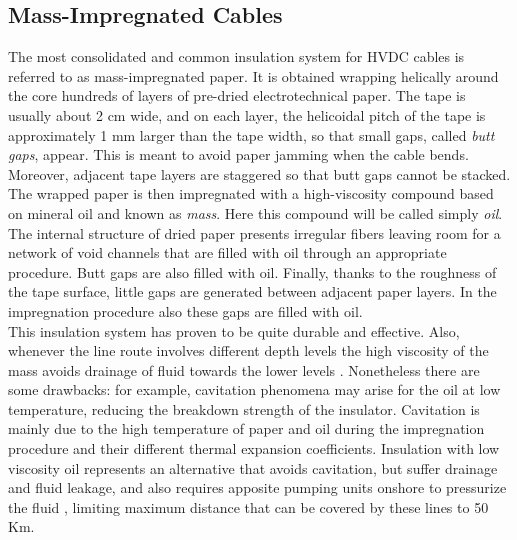 \documentclass[11pt,a4paper]{article}
\begin{document}
\subsection{Mass-Impregnated Cables}
The most consolidated and common insulation system for HVDC cables is referred to as mass-impregnated paper. It is obtained wrapping helically around the core hundreds of layers of pre-dried electrotechnical paper. The tape is usually about 2 cm wide, and on each layer, the helicoidal pitch of the tape is approximately 1 mm larger than the tape width, so that small gaps, called \textit{butt gaps}, appear. This is meant to avoid paper jamming when the cable bends. Moreover, adjacent tape layers are staggered so that butt gaps cannot be stacked.\\
The wrapped paper is then impregnated with a high-viscosity compound based on mineral oil and known as \textit{mass}. Here this compound will be called simply \textit{oil}. The internal structure of dried paper presents irregular fibers leaving room for a network of void channels that are filled with oil through an appropriate procedure. Butt gaps are also filled with oil. Finally, thanks to the roughness of the tape surface, little gaps are generated between adjacent paper layers. In the impregnation procedure also these gaps are filled with oil.\\
This insulation system has proven to be quite durable and effective. Also, whenever the line route involves different depth levels the high viscosity of the mass avoids drainage of fluid towards the lower levels \cite{ancient_and_modern_cables}. Nonetheless there are some drawbacks: for example, cavitation phenomena may arise for the oil at low temperature, reducing the breakdown strength of the insulator. Cavitation is mainly due to the high temperature of paper and oil during the impregnation procedure and their different thermal expansion coefficients. Insulation with low viscosity oil represents an alternative that avoids cavitation, but suffer drainage and fluid leakage, and also requires apposite pumping units onshore to pressurize the fluid \cite{hakonseththesis}, limiting maximum distance that can be covered by these lines to 50 Km.\\

\end{document}
